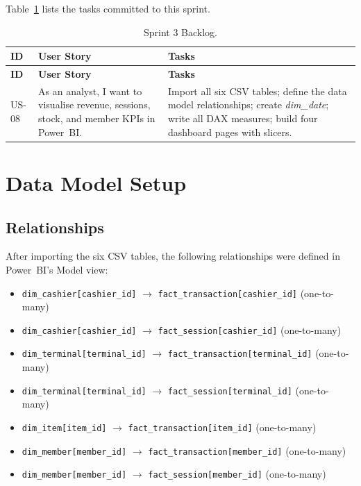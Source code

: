 Table~\ref{tab:sprint3_backlog} lists the tasks committed to this sprint.

\begin{longtable}{>{\bfseries}p{1.3cm} p{4.2cm} p{7cm}}
  \caption{Sprint 3 Backlog.\label{tab:sprint3_backlog}} \\
  \toprule
  \textbf{ID} & \textbf{User Story} & \textbf{Tasks} \\
  \midrule
  \endfirsthead
  \toprule
  \textbf{ID} & \textbf{User Story} & \textbf{Tasks} \\
  \midrule
  \endhead
  \bottomrule
  \endfoot

  US-08 & As an analyst, I want to visualise revenue, sessions, stock, and
          member KPIs in Power~BI.
        & Import all six CSV tables; define the data model relationships; create
          \textit{dim\_date}; write all DAX measures; build four dashboard pages
          with slicers. \\
\end{longtable}

\section{Data Model Setup}

\subsection{Relationships}

After importing the six CSV tables, the following relationships were defined in
Power~BI's Model view:

\begin{itemize}[noitemsep]
  \item \texttt{dim\_cashier[cashier\_id]} $\rightarrow$
        \texttt{fact\_transaction[cashier\_id]} (one-to-many)
  \item \texttt{dim\_cashier[cashier\_id]} $\rightarrow$
        \texttt{fact\_session[cashier\_id]} (one-to-many)
  \item \texttt{dim\_terminal[terminal\_id]} $\rightarrow$
        \texttt{fact\_transaction[terminal\_id]} (one-to-many)
  \item \texttt{dim\_terminal[terminal\_id]} $\rightarrow$
        \texttt{fact\_session[terminal\_id]} (one-to-many)
  \item \texttt{dim\_item[item\_id]} $\rightarrow$
        \texttt{fact\_transaction[item\_id]} (one-to-many)
  \item \texttt{dim\_member[member\_id]} $\rightarrow$
        \texttt{fact\_transaction[member\_id]} (one-to-many)
  \item \texttt{dim\_member[member\_id]} $\rightarrow$
        \texttt{fact\_session[member\_id]} (one-to-many)
\end{itemize}

